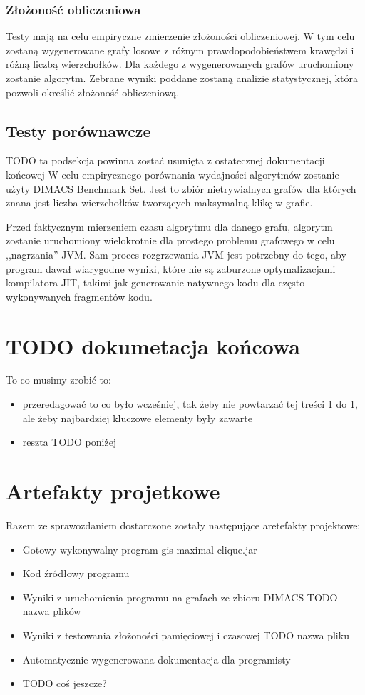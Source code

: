 \documentclass[12pt, a4paper]{article}
\begin{document}
\subsubsection{Złożoność obliczeniowa}
Testy mają na celu empiryczne zmierzenie złożoności obliczeniowej. W tym celu zostaną wygenerowane grafy losowe z różnym prawdopodobieństwem krawędzi i różną liczbą wierzchołków. Dla każdego z wygenerowanych grafów uruchomiony zostanie algorytm. Zebrane wyniki poddane zostaną analizie statystycznej, która pozwoli określić złożoność obliczeniową.



\subsection{Testy porównawcze}
TODO ta podsekcja powinna zostać usunięta z ostatecznej dokumentacji końcowej
W celu empirycznego porównania wydajności algorytmów zostanie użyty DIMACS Benchmark Set\citep{dimacs}. Jest to zbiór nietrywialnych grafów 
dla których znana jest liczba wierzchołków tworzących maksymalną klikę w grafie.

Przed faktycznym mierzeniem czasu algorytmu dla danego grafu, algorytm zostanie uruchomiony wielokrotnie dla prostego problemu grafowego w celu ,,nagrzania'' JVM. Sam proces rozgrzewania JVM jest potrzebny do tego, aby program dawał wiarygodne wyniki, które nie są zaburzone optymalizacjami kompilatora JIT, takimi jak generowanie natywnego kodu dla często wykonywanych fragmentów kodu.

\section{TODO dokumetacja końcowa}
To co musimy zrobić to:
\begin{itemize}
\item przeredagować to co było wcześniej, tak żeby nie powtarzać tej treści 1 do 1, ale żeby najbardziej kluczowe elementy były zawarte
\item reszta TODO poniżej
\end{itemize}

\section{Artefakty projetkowe}
Razem ze sprawozdaniem dostarczone zostały następujące aretefakty projektowe:
\begin{itemize}
\item Gotowy wykonywalny program gis-maximal-clique.jar
\item Kod źródłowy programu
\item Wyniki z uruchomienia programu na grafach ze zbioru DIMACS TODO nazwa plików
\item Wyniki z testowania złożoności pamięciowej i czasowej TODO nazwa pliku
\item Automatycznie wygenerowana dokumentacja dla programisty
\item TODO coś jeszcze?
\end{itemize}
\end{document}
